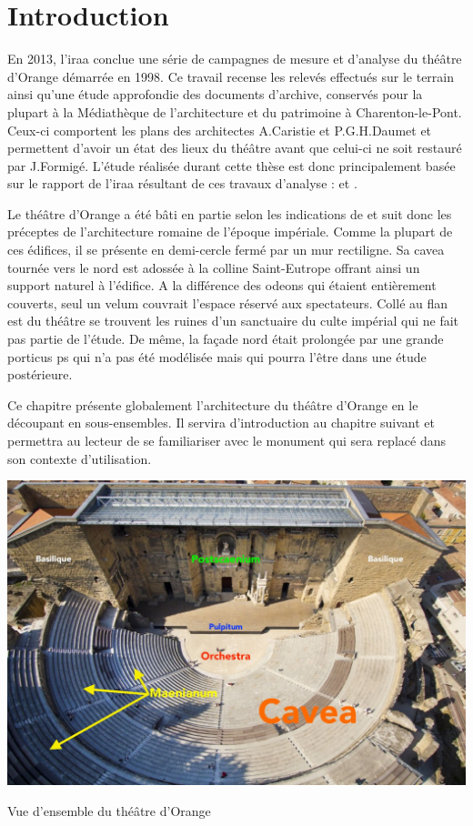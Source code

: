 		\section{Introduction}
		
		En 2013, l'\gls{iraa} conclue une série de campagnes de mesure et d'analyse du théâtre d'Orange démarrée en 1998. Ce travail recense les relevés effectués sur le terrain ainsi qu'une étude approfondie des documents d'archive, conservés pour la plupart à la Médiathèque de l'architecture et du patrimoine à Charenton-le-Pont. Ceux-ci comportent les plans des architectes A.Caristie et P.G.H.Daumet et permettent d'avoir un état des lieux du théâtre avant que celui-ci ne soit restauré par J.Formigé. L'étude réalisée durant cette thèse est donc principalement basée sur le rapport de l'\gls{iraa} résultant de ces travaux d'analyse : \cite{orangeTxt} et \citep{orangePl}.
		
		Le théâtre d'Orange a été bâti en partie selon les indications de \cite{vitruve} et suit donc les préceptes de l'architecture romaine de l'époque impériale. Comme la plupart de ces édifices, il se présente en demi-cercle fermé par un mur rectiligne. Sa \gls{cavea} tournée vers le nord est adossée à la colline Saint-Eutrope offrant ainsi un support naturel à l'édifice. A la différence des \glspl{odeon} qui étaient entièrement couverts, seul un \gls{velum} couvrait l'espace réservé aux spectateurs. Collé au flan est du théâtre se trouvent les ruines d'un sanctuaire du culte impérial qui ne fait pas partie de l'étude. De même, la façade nord était prolongée par une grande \gls{porticus ps} qui n'a pas été modélisée mais qui pourra l'être dans une étude postérieure. 
		
		Ce chapitre présente globalement l'architecture du théâtre d'Orange en le découpant en sous-ensembles. Il servira d'introduction au chapitre suivant et permettra au lecteur de se familiariser avec le monument qui sera replacé dans son contexte d'utilisation.

	\begin{figureth}
			\includegraphics[width=\linewidth]{images/vuensemble}
			\caption[Vue d'ensemble du théâtre d'Orange]{Vue d'ensemble du théâtre d'Orange \footnotemark}
	\end{figureth}

